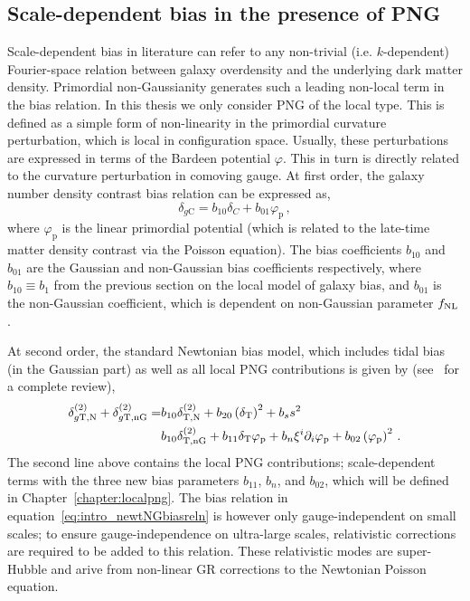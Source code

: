 \subsection{Scale-dependent bias in the presence of PNG}
Scale-dependent bias in literature can refer to any non-trivial (i.e. $k$-dependent) Fourier-space relation between galaxy overdensity and the underlying dark matter density. Primordial non-Gaussianity generates such a leading non-local term in the bias relation. In this thesis we only consider PNG of the local type. This is defined as a simple form of non-linearity in the primordial curvature perturbation, which is local in configuration space. Usually, these perturbations are expressed in terms of the Bardeen potential $\varphi$. This in turn is directly related to the curvature perturbation in comoving gauge. At first order, the galaxy number density contrast bias relation can be expressed as, 
\begin{equation}
	\delta_{g\mathrm{C}} = b_{10} \delta_C + b_{01} \varphi_\mathrm{p}\,,
\end{equation}
where $\varphi_\mathrm{p}$ is the linear primordial potential (which is related to the late-time matter density contrast via the Poisson equation). The bias coefficients $b_{10}$ and $b_{01}$ are the Gaussian and non-Gaussian bias coefficients respectively, where $b_{10} \equiv b_1$ from the previous section on the local model of galaxy bias, and $b_{01}$ is the non-Gaussian coefficient, which is dependent on non-Gaussian parameter $f_\text{NL}$.

At second order, the standard Newtonian bias model, which includes tidal bias (in the Gaussian part) as well as all local PNG contributions is given by (see~\cite{Desjacques:2016bnm} for a complete review), 
\begin{align}\label{eq:intro_newtNGbiasreln}
	\delta^{(2)}_{g\mathrm{T,N}} + \delta^{(2)}_{g\mathrm{T,nG}} =& b_{10} \delta^{(2)}_\mathrm{T,N} + b_{20} \left( \delta_\mathrm{T} \right)^2 + b_s s^2 \nonumber \\
	& b_{10} \delta^{(2)}_\mathrm{T,nG} + b_{11} \delta_\mathrm{T} \varphi_\mathrm{p} + b_n \xi^i \partial_i \varphi_\mathrm{p} + b_{02} \left( \varphi_\mathrm{p} \right)^2\,.
\end{align}
The second line above contains the local PNG contributions; scale-dependent terms with the three new bias parameters $b_{11}$, $b_{n}$, and $b_{02}$, which will be defined in Chapter~\ref{chapter:localpng}. The bias relation in equation~\eqref{eq:intro_newtNGbiasreln} is however only gauge-independent on small scales; to ensure gauge-independence on ultra-large scales, relativistic corrections are required to be added to this relation. These relativistic modes are super-Hubble and arive from non-linear GR corrections to the Newtonian Poisson equation.


